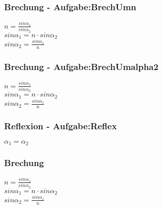 \subsubsection{Brechung - Aufgabe:BrechUmn} 
\begin{minipage}{0.45\textwidth} 
$ n = \frac{sin\alpha _{1} }{sin\alpha _{2} } $\\ 
$ sin\alpha _{1}  = n\cdot sin\alpha _{2} $\\ 
$ sin\alpha _{2}  = \frac{sin\alpha _{1} }{ n} $\\ 
\end{minipage} 
\begin{minipage}{0.45\textwidth} 
 
\end{minipage} 
\subsubsection{Brechung - Aufgabe:BrechUmalpha2} 
\begin{minipage}{0.45\textwidth} 
$ n = \frac{sin\alpha _{1} }{sin\alpha _{2} } $\\ 
$ sin\alpha _{1}  = n\cdot sin\alpha _{2} $\\ 
$ sin\alpha _{2}  = \frac{sin\alpha _{1} }{ n} $\\ 
\end{minipage} 
\begin{minipage}{0.45\textwidth} 
 
\end{minipage} 
\subsubsection{Reflexion - Aufgabe:Reflex} 
\begin{minipage}{0.45\textwidth} 
$ \alpha _{1}  = \alpha _{2} $\\ 
\end{minipage} 
\begin{minipage}{0.45\textwidth} 
 
\end{minipage} 
\subsubsection{Brechung} 
\begin{minipage}{0.45\textwidth} 
$ n = \frac{sin\alpha _{1} }{sin\alpha _{2} } $\\ 
$ sin\alpha _{1}  = n\cdot sin\alpha _{2} $\\ 
$ sin\alpha _{2}  = \frac{sin\alpha _{1} }{ n} $\\ 
\end{minipage} 
\begin{minipage}{0.45\textwidth} 
 
\end{minipage} 

